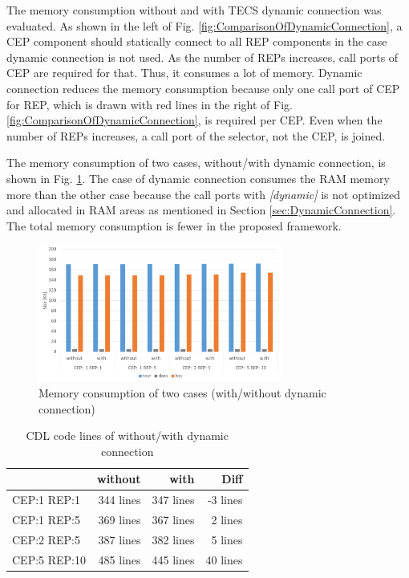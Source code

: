 \documentclass[conference]{IEEEtran/IEEEtran}
\begin{document}
The memory consumption without and with TECS dynamic connection was evaluated.
As shown in the left of Fig. \ref{fig:ComparisonOfDynamicConnection}, a CEP component should statically connect to all REP components in the case dynamic connection is not used.
As the number of REPs increases, call ports of CEP are required for that.
Thus, it consumes a lot of memory. 
Dynamic connection reduces the memory consumption because only one call port of CEP for REP, which is drawn with red lines in the right of Fig. \ref{fig:ComparisonOfDynamicConnection}, is required per CEP.
Even when the number of REPs increases, a call port of the selector, not the CEP, is joined.

The memory consumption of two cases, without/with dynamic connection, is shown in Fig. \ref{fig:EvaluationOfDynamicConnection}.
The case of dynamic connection consumes the RAM memory more than the other case because the call ports with {\it [dynamic]} is not optimized and allocated in RAM areas as mentioned in Section \ref{sec:DynamicConnection}.
The total memory consumption is fewer in the proposed framework.

\begin{figure}[t]
    \centering
    \includegraphics[width=8.0cm,clip]{figure/EvaluationOfDynamicConnection.pdf}
    \caption{Memory consumption of two cases (with/without dynamic connection)}
    \label{fig:EvaluationOfDynamicConnection}
\end{figure}

\begin{table}[t]
    \centering
    \caption{CDL code lines of without/with dynamic connection}
    \begin{tabular}{l|r|r|r}
        \hline\hline
                     &  without  &  with  &  Diff  \\ \hline
        CEP:1 REP:1  &  344 lines     &  347 lines  &  -3 lines   \\
        CEP:1 REP:5  &  369 lines     &  367 lines  &   2 lines   \\
        CEP:2 REP:5  &  387 lines     &  382 lines  &   5 lines   \\
        CEP:5 REP:10 &  485 lines     &  445 lines  &  40 lines   \\
        \hline
    \end{tabular}
    \label{tab:EvaluationOfConfigurabilityByDynamicConnection}
\end{table}
\end{document}
